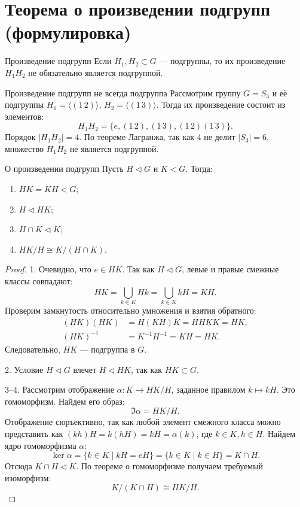 
\section{Теорема о произведении подгрупп (формулировка)}

\begin{Remark}{Произведение подгрупп}{}
	Если $H_1, H_2 \subset G$ --- подгруппы, то их произведение $H_1H_2$ не обязательно является подгруппой.
\end{Remark}

\begin{Example}{Произведение подгрупп не всегда подгруппа}{}
	Рассмотрим группу $G = S_3$ и её подгруппы $H_1 = \langle(1\,2)\rangle$, $H_2 = \langle(1\,3)\rangle$. Тогда их произведение состоит из элементов:
	\[
	H_1H_2 = \{ e, (1\,2), (1\,3), (1\,2)(1\,3) \}.
	\]
	Порядок $|H_1H_2| = 4$. По теореме Лагранжа, так как 4 не делит $|S_3| = 6$, множество $H_1H_2$ не является подгруппой.
\end{Example}

\begin{Theorem}{О произведении подгрупп}{}
	Пусть $H \triangleleft G$ и $K < G$. Тогда:
	\begin{enumerate}
		\item $HK = KH < G$;
		\item $H \triangleleft HK$;
		\item $H \cap K \triangleleft K$;
		\item $HK/H \cong K/(H \cap K)$.
	\end{enumerate}
\end{Theorem}

\begin{proof}
	1. Очевидно, что $e \in HK$. Так как $H \triangleleft G$, левые и правые смежные классы совпадают:
	\[
	HK = \bigcup_{k \in K} Hk = \bigcup_{k \in K} kH = KH.
	\]
	Проверим замкнутость относительно умножения и взятия обратного:
	\begin{align*}
		(HK)(HK) &= H(KH)K = HHKK = HK, \\
		(HK)^{-1} &= K^{-1}H^{-1} = KH = HK.
	\end{align*}
	Следовательно, $HK$ --- подгруппа в $G$.

	2. Условие $H \triangleleft G$ влечет $H \triangleleft HK$, так как $HK \subset G$.

	3--4. Рассмотрим отображение $\alpha \colon K \to HK/H$, заданное правилом $k \mapsto kH$. Это гомоморфизм. Найдем его образ:
	\[
	\Im \alpha = HK/H.
	\]
	Отображение сюръективно, так как любой элемент смежного класса можно представить как $(kh)H = k(hH) = kH = \alpha(k)$, где $k \in K, h \in H$. Найдем ядро гомоморфизма $\alpha$:
	\[
	\ker \alpha = \{ k \in K \mid kH = eH \} = \{ k \in K \mid k \in H \} = K \cap H.
	\]
	Отсюда $K \cap H \triangleleft K$. По теореме о гомоморфизме получаем требуемый изоморфизм:
	\[
	K/(K \cap H) \cong HK/H.
	\]
\end{proof}
